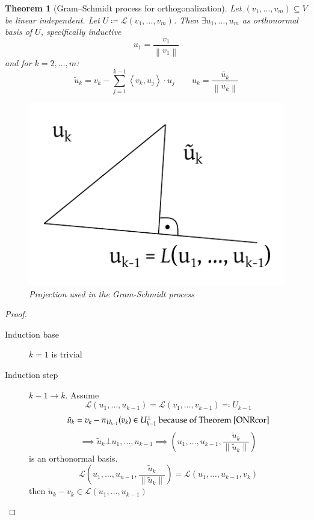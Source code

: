 \documentclass[a4paper]{article}
\newcounter{lecref}[section]
\numberwithin{lecref}{section}
\newtheorem{theorem}[lecref]{Theorem}
\newcommand{\ip}[2]{\left\langle#1,#2\right\rangle} %
\newcommand{\norm}[1]{\left\|#1\right\|}
\begin{document}
\begin{theorem}[Gram–Schmidt process for orthogonalization] %
  Let $(v_1, \ldots, v_m) \subseteq V$ be linear independent.
  Let $U \coloneqq \mathcal L(v_1, \ldots, v_m)$.
  Then $\exists u_1, \ldots, u_m$ as orthonormal basis of $U$, specifically inductive
  \[ u_1 = \frac{v_1}{\norm{v_1}} \]
  and for $k = 2, \ldots, m$:
  \[ \tilde u_k = v_k - \sum_{j=1}^{k-1} \ip{v_k}{u_j} \cdot u_j \qquad
     u_k = \frac{\tilde{u_k}}{\norm{u_k}} \]
  \begin{figure}[t]
    \begin{center}
      \includegraphics{img/12_GS_projection.pdf}
      \caption{Projection used in the Gram-Schmidt process}
      \label{GSproj}
    \end{center}
  \end{figure}
\end{theorem}

\begin{proof}
  \begin{description}
    \item[Induction base] $k=1$ is trivial
    \item[Induction step] $k-1 \to k$. Assume
      \[ \mathcal L(u_1, \ldots, u_{k-1}) = \mathcal L(v_1, \ldots, v_{k-1}) \eqqcolon U_{k-1} \]
      \[ \tilde u_k = v_k - \pi_{U_{k-1}}(v_k) \in U_{k-1}^\bot \text{ because of Theorem~\ref{ONRcor}} \]
      \[ \implies \tilde u_k \bot u_1, \ldots, u_{k-1} \implies (u_1, \ldots, u_{k-1}, \frac{\tilde u_k}{\norm{\tilde u_k}}) \]
      is an orthonormal basis.
      \[
        \mathcal L(u_1, \ldots, u_{n-1}, \frac{\tilde u_k}{\norm{\tilde u_k}})
          = \mathcal L(u_1, \ldots, u_{k-1}, v_k)
      \]
      then $\tilde u_k - v_k \in \mathcal L(u_1, \ldots, u_{k-1})$
  \end{description}
\end{proof}
\end{document}
